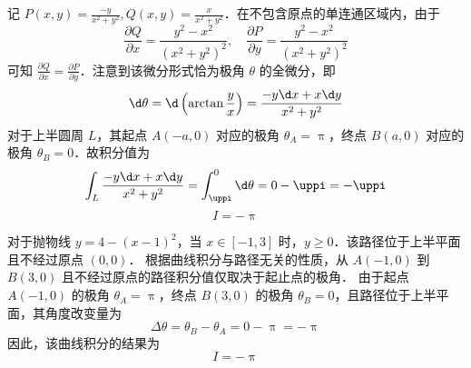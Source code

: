\begin{solution}

    记 $P(x, y) = \frac{-y}{x^2 + y^2}, Q(x, y) = \frac{x}{x^2 + y^2}$．在不包含原点的单连通区域内，由于
    \begin{equation}
        \label{eq:partial-derivatives}
        \frac{\partial Q}{\partial x} = \frac{y^2 - x^2}{(x^2 + y^2)^2}, \quad \frac{\partial P}{\partial y} = \frac{y^2 - x^2}{(x^2 + y^2)^2}
    \end{equation}
    可知 $\frac{\partial Q}{\partial x} = \frac{\partial P}{\partial y}$．注意到该微分形式恰为极角 $\theta$ 的全微分，即
    \begin{equation}
        \d \theta = \d \left( \arctan \frac{y}{x} \right) = \frac{-y \d x + x \d y}{x^2 + y^2}
    \end{equation}
    对于上半圆周 $L$，其起点 $A(-a, 0)$ 对应的极角 $\theta_A = \uppi$，终点 $B(a, 0)$ 对应的极角 $\theta_B = 0$．故积分值为
    \begin{equation}
        \int_L \frac{-y \d x + x \d y}{x^2 + y^2} = \int_{\uppi}^0 \d \theta = 0 - \uppi = -\uppi
    \end{equation}
    \begin{equation}
        \boxed{I = -\uppi}
    \end{equation}


    对于抛物线 $y = 4 - (x - 1)^2$，当 $x \in [-1, 3]$ 时，$y \ge 0$．该路径位于上半平面且不经过原点 $(0,0)$．
    根据曲线积分与路径无关的性质，从 $A(-1, 0)$ 到 $B(3, 0)$ 且不经过原点的路径积分值仅取决于起止点的极角．
    由于起点 $A(-1, 0)$ 的极角 $\theta_A = \uppi$，终点 $B(3, 0)$ 的极角 $\theta_B = 0$，且路径位于上半平面，其角度改变量为
    \begin{equation}
        \Delta \theta = \theta_B - \theta_A = 0 - \uppi = -\uppi
    \end{equation}
    因此，该曲线积分的结果为
    \begin{equation}
        \boxed{I = -\uppi}
    \end{equation}
\end{solution}

